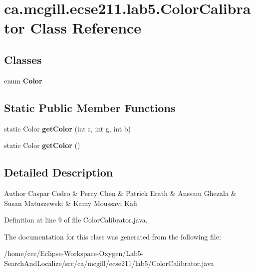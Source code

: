 \hypertarget{classca_1_1mcgill_1_1ecse211_1_1lab5_1_1_color_calibrator}{}\section{ca.\+mcgill.\+ecse211.\+lab5.\+Color\+Calibrator Class Reference}
\label{classca_1_1mcgill_1_1ecse211_1_1lab5_1_1_color_calibrator}
\subsection*{Classes}
\begin{DoxyCompactItemize}
\item 
enum {\bfseries Color}
\end{DoxyCompactItemize}
\subsection*{Static Public Member Functions}
\begin{DoxyCompactItemize}
\item 
\mbox{\label{classca_1_1mcgill_1_1ecse211_1_1lab5_1_1_color_calibrator_a115188f4d3b465e09db3482f8a6f25d2}} 
static Color {\bfseries get\+Color} (int r, int g, int b)
\item 
\mbox{\label{classca_1_1mcgill_1_1ecse211_1_1lab5_1_1_color_calibrator_ac6a2e41db5bd91b1356f53106178862e}} 
static Color {\bfseries get\+Color} ()
\end{DoxyCompactItemize}


\subsection{Detailed Description}
\begin{DoxyAuthor}{Author}
Caspar Cedro \& Percy Chen \& Patrick Erath \& Anssam Ghezala \& Susan Matuszewski \& Kamy Moussavi Kafi 
\end{DoxyAuthor}


Definition at line 9 of file Color\+Calibrator.\+java.



The documentation for this class was generated from the following file\+:\begin{DoxyCompactItemize}
\item 
/home/ccc/\+Eclipse-\/\+Workspace-\/\+Oxygen/\+Lab5-\/\+Search\+And\+Localize/src/ca/mcgill/ecse211/lab5/Color\+Calibrator.\+java\end{DoxyCompactItemize}
